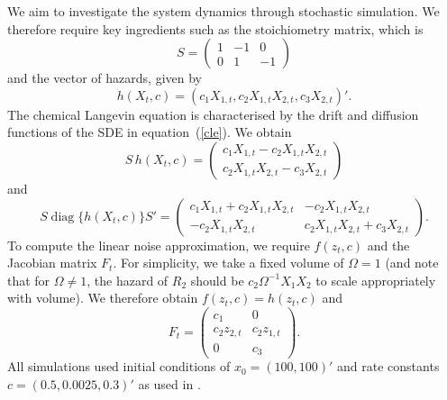 \documentclass[12pt, DIV12]{scrartcl}
\begin{document}
We aim to investigate the system dynamics through stochastic simulation. We
therefore require key ingredients such as the stoichiometry matrix, which is
\[
S = \begin{pmatrix} 
1 & -1 & 0\\
0 & 1 & -1
\end{pmatrix}
\]
and the vector of hazards, given by
\[
h(X_{t},c) = \left(c_{1}X_{1,t}, c_{2}X_{1,t}X_{2,t}, c_{3}X_{2,t}\right)'.
\]
The chemical Langevin equation is characterised by the drift and diffusion functions 
of the SDE in equation~(\ref{cle}). We obtain
\[
S\,h(X_{t},c) = 
\begin{pmatrix}
  c_{1}X_{1,t}-c_{2}X_{1,t}X_{2,t} \\
  c_{2}X_{1,t}X_{2,t}-c_{3}X_{2,t}
\end{pmatrix} 
\]
and
\[
S\operatorname{diag}\{h(X_{t},c)\}S' = 
\begin{pmatrix}
  c_{1}X_{1,t}+c_{2}X_{1,t}X_{2,t} & -c_{2}X_{1,t}X_{2,t} \\
  -c_{2}X_{1,t}X_{2,t}	 & c_{2}X_{1,t}X_{2,t}+c_{3}X_{2,t}
\end{pmatrix}. 
\]
To compute the linear noise approximation, we require $f(z_{t},c)$ and the
Jacobian matrix $F_{t}$. For simplicity, we take a fixed volume of $\Omega=1$
(and note that for $\Omega \neq 1$, the hazard of $R_{2}$ should be
$c_{2}\Omega^{-1}X_{1}X_{2}$ to scale appropriately with volume). We therefore
obtain $f(z_{t},c)=h(z_{t},c)$ and
\[
F_{t}=\left(
\begin{array}{cc}
  c_{1} & 0 \\
  c_{2}z_{2,t} & c_{2}z_{1,t}\\
  0 & c_{3} 
\end{array}\right).
\]
All simulations used initial conditions of $x_{0}=(100,100)'$ and rate constants
$c=(0.5,0.0025,0.3)'$ as used in \cite{BWK08}. 
\end{document}
